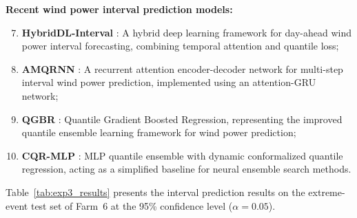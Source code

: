 \textbf{Recent wind power interval prediction models:}
\begin{enumerate}
    \setcounter{enumi}{6}
    \item \textbf{HybridDL-Interval} \citep{hybriddl2025}: A hybrid deep learning framework for day-ahead wind power interval forecasting, combining temporal attention and quantile loss;
    \item \textbf{AMQRNN} \citep{amqrnn2025}: A recurrent attention encoder-decoder network for multi-step interval wind power prediction, implemented using an attention-GRU network;
    \item \textbf{QGBR} \citep{hu2025ncqgbr}: Quantile Gradient Boosted Regression, representing the improved quantile ensemble learning framework for wind power prediction;
    \item \textbf{CQR-MLP} \citep{hu2025nescqr}: MLP quantile ensemble with dynamic conformalized quantile regression, acting as a simplified baseline for neural ensemble search methods.
\end{enumerate}


Table~\ref{tab:exp3_results} presents the interval prediction results on the extreme-event test set of Farm~6 at the 95\% confidence level ($\alpha = 0.05$).

